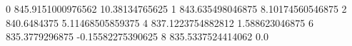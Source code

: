 0 845.9151000976562 10.38134765625
1 843.635498046875 8.10174560546875
2 840.6484375 5.11468505859375
4 837.1223754882812 1.588623046875
6 835.3779296875 -0.15582275390625
8 835.5337524414062 0.0
